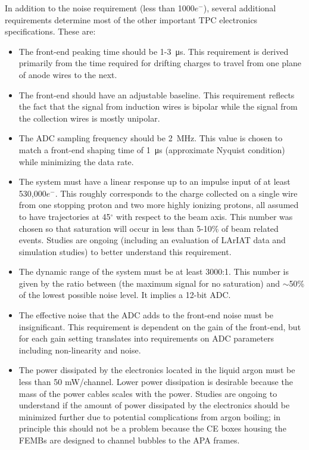 In addition to the noise requirement (less than 1000$e^{-}$), several additional requirements determine most of the other important TPC electronics specifications.  These are:

\begin{itemize}
\item{The front-end peaking time should be 1-3~\si{\micro\second}.  This requirement is derived primarily from the time required for drifting charges to travel from one plane of anode wires to the next.}
\item{The front-end should have an adjustable baseline.  This requirement reflects the fact that the signal from induction wires is bipolar while the signal from the collection wires is mostly unipolar.}
\item{The ADC sampling frequency should be 2~MHz.  This value is chosen to match a front-end shaping time of 1~\si{\micro\second} (approximate Nyquist condition) while minimizing the data rate.}
\item{The system must have a linear response up to an impulse input of at least 530,000$e^{-}$.  This roughly corresponds to the charge collected on a single wire from one stopping proton and two more highly ionizing protons, all assumed to have trajectories at 45$^{\circ}$ with respect to the beam axis.  This number was chosen so that saturation will occur in less than 5-10\% of beam related events.  Studies are ongoing (including an evaluation of LArIAT data and simulation studies) to better understand this requirement.}
\item{The dynamic range of the system must be at least 3000:1. This number is given by the ratio between (the maximum signal for no saturation) and $\sim$50\% of the lowest possible noise level.  It implies a 12-bit ADC.}
\item{The effective noise that the ADC adds to the front-end noise must be insignificant.  This requirement is dependent on the gain of the front-end, but for each gain setting translates into requirements on ADC parameters including non-linearity and noise.}
\item{The power dissipated by the electronics located in the liquid argon must be less than 50 mW/channel.  Lower power dissipation is desirable because the mass of the power cables scales with the power. Studies are ongoing to understand if the amount of power dissipated by the electronics should be minimized further due to potential complications from argon boiling; in principle this should not be a problem because the CE boxes housing the FEMBs are designed to channel bubbles to the APA frames.}
\end{itemize}

